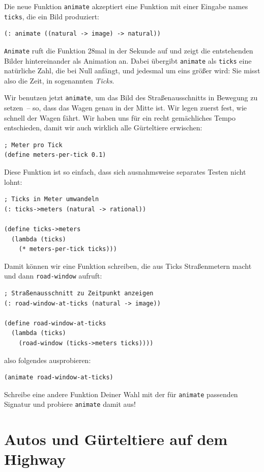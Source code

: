 Die neue Funktion \lstinline{animate} akzeptiert eine Funktion mit
einer Eingabe names \lstinline{ticks}, die ein Bild produziert:
%
\begin{lstlisting}
(: animate ((natural -> image) -> natural))
\end{lstlisting}
%
\lstinline{Animate} ruft die Funktion 28mal in der Sekunde auf und
zeigt die entstehenden Bilder hintereinander als Animation an.  Dabei
übergibt \lstinline{animate} als \lstinline{ticks} eine natürliche
Zahl, die bei Null anfängt, und jedesmal um eins größer wird: Sie
misst also die Zeit, in sogenannten \textit{Ticks}.

Wir benutzen jetzt \lstinline{animate}, um das Bild des
Straßenausschnitts in Bewegung zu setzen~-- so, dass das Wagen genau
in der Mitte ist.  Wir legen zuerst fest, wie schnell der Wagen fährt.
Wir haben uns für ein recht gemächliches Tempo entschieden, damit wir auch
wirklich alle Gürteltiere erwischen:
%
\begin{lstlisting}
; Meter pro Tick
(define meters-per-tick 0.1)
\end{lstlisting}
%
Diese Funktion ist so einfach, dass sich ausnahmsweise separates
Testen nicht lohnt:
%
\begin{lstlisting}
; Ticks in Meter umwandeln
(: ticks->meters (natural -> rational))

(define ticks->meters
  (lambda (ticks)
    (* meters-per-tick ticks)))
\end{lstlisting}
%
Damit können wir eine Funktion schreiben, die aus Ticks Straßenmetern
macht und dann \lstinline{road-window} aufruft:
%
\begin{lstlisting}
; Straßenausschnitt zu Zeitpunkt anzeigen
(: road-window-at-ticks (natural -> image))

(define road-window-at-ticks
  (lambda (ticks)
    (road-window (ticks->meters ticks))))
\end{lstlisting}
also folgendes ausprobieren:
%
\begin{lstlisting}
(animate road-window-at-ticks)
\end{lstlisting}
%
\begin{aufgabeinline}
  Schreibe eine andere Funktion Deiner Wahl mit der für
  \lstinline{animate} passenden Signatur und probiere
  \lstinline{animate} damit aus!
\end{aufgabeinline}

\section{Autos und Gürteltiere auf dem Highway}

